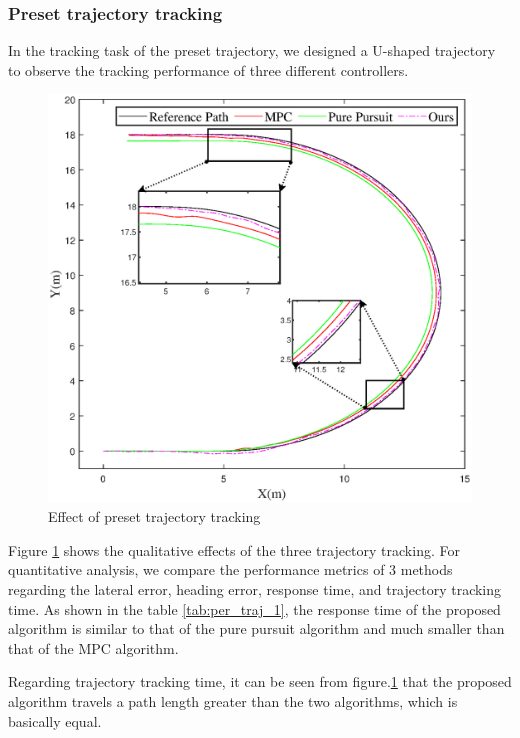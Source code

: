 \documentclass[sn-mathphys]{sn-jnl}%
\theoremstyle{thmstyleone}%
\theoremstyle{thmstyletwo}%
\theoremstyle{thmstylethree}%
\begin{document}
\subsubsection{ Preset trajectory tracking}
In the tracking task of the preset trajectory, we designed a U-shaped trajectory to observe the tracking performance of three different controllers.
\begin{figure}
	\centering
	\includegraphics[width=0.9\linewidth]{track1}
	\caption{Effect of preset trajectory tracking}
	\label{fig:Effect}
\end{figure}


Figure \ref{fig:Effect} shows the qualitative effects of the three trajectory tracking. For quantitative analysis, we compare the performance metrics of 3 methods regarding the lateral error, heading error, response time, and trajectory tracking time. As shown in the table \ref{tab:per_traj_1}, the response time of the proposed algorithm is similar to that of the pure pursuit algorithm and much smaller than that of the MPC algorithm.

Regarding trajectory tracking time, it can be seen from figure.\ref{fig:Effect} that the proposed algorithm travels a path length greater than the two algorithms, which is basically equal.
\end{document}

